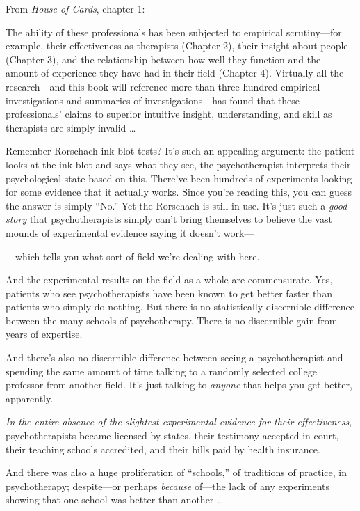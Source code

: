 {
 From \textit{House of Cards}, chapter 1:}

{
 The ability of these professionals has been subjected to empirical
scrutiny---for example, their effectiveness as therapists (Chapter 2),
their insight about people (Chapter 3), and the relationship between
how well they function and the amount of experience they have had in
their field (Chapter 4). Virtually all the research---and this book
will reference more than three hundred empirical investigations and
summaries of investigations---has found that these
professionals' claims to superior intuitive insight,
understanding, and skill as therapists are simply invalid \ldots}

{
 Remember Rorschach ink-blot tests? It's such an
appealing argument: the patient looks at the ink-blot and says what
they see, the psychotherapist interprets their psychological state
based on this. There've been hundreds of experiments
looking for some evidence that it actually works. Since
you're reading this, you can guess the answer is simply
``No.'' Yet the Rorschach is still
in use. It's just such a \textit{good story} that
psychotherapists simply can't bring themselves to
believe the vast mounds of experimental evidence saying it
doesn't work---}

{
 {}---which tells you what sort of field we're
dealing with here.}

{
 And the experimental results on the field as a whole are
commensurate. Yes, patients who see psychotherapists have been known to
get better faster than patients who simply do nothing. But there is no
statistically discernible difference between the many schools of
psychotherapy. There is no discernible gain from years of expertise.}

{
 And there's also no discernible difference between
seeing a psychotherapist and spending the same amount of time talking
to a randomly selected college professor from another field.
It's just talking to \textit{anyone} that helps you get
better, apparently.}

{
 \textit{In the entire absence of the slightest experimental
evidence for their effectiveness}, psychotherapists became licensed by
states, their testimony accepted in court, their teaching schools
accredited, and their bills paid by health insurance.}

{
 And there was also a huge proliferation of
``schools,'' of traditions of
practice, in psychotherapy; despite---or perhaps \textit{because}
of---the lack of any experiments showing that one school was better
than another \ldots}

